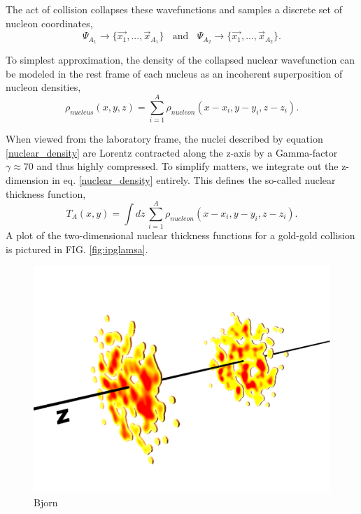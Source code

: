\documentclass[aps,prc,reprint,amsmath,nofootinbib]{revtex4-1}
\begin{document}
The act of collision collapses these wavefunctions and samples a discrete set of nucleon coordinates,
\begin{equation}
 \Psi_{A_1} \rightarrow \{\vec{x_1},...,\vec{x}_{A_1}\} ~~~~ \mbox{and} ~~~~ \Psi_{A_2} \rightarrow \{\vec{x_1},...,\vec{x}_{A_2}\}.
\end{equation}

To simplest approximation, the density of the collapsed nuclear wavefunction can be modeled in the rest frame of each nucleus as an incoherent superposition 
of nucleon densities,
\begin{equation}
 \label{nuclear_density}
 \rho_{nucleus}(x,y,z) = \sum\limits_{i=1}^{A} \rho_{nucleon}(x-x_i,y-y_i,z-z_i).
\end{equation}

When viewed from the laboratory frame, the nuclei described by equation \ref{nuclear_density} are Lorentz contracted along the z-axis by a Gamma-factor 
$\gamma \approx 70$ and thus highly compressed. To simplify matters, we integrate out the z-dimension in eq. \ref{nuclear_density} entirely. 
This defines the so-called nuclear thickness function,
\begin{equation}
 T_{A}(x,y) = \int dz\, \sum\limits_{i=1}^{A} \rho_{nucleon}(x-x_i,y-y_i,z-z_i).
\end{equation}
A plot of the two-dimensional nuclear thickness functions for a gold-gold collision is pictured in FIG. \ref{fig:ipglamsa}.



\begin{figure}
 \includegraphics[width=\columnwidth]{wgmu}
 \caption{\label{fig:ipglasma} Bjorn}
\end{figure}
\end{document}
